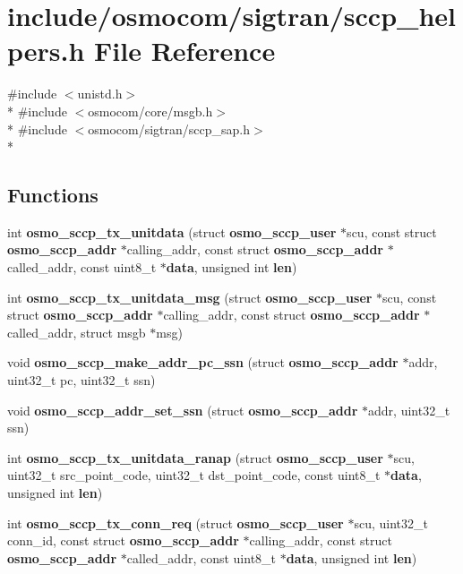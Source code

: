 \section{include/osmocom/sigtran/sccp\+\_\+helpers.h File Reference}
\label{sccp__helpers_8h}
{\ttfamily \#include $<$unistd.\+h$>$}\\*
{\ttfamily \#include $<$osmocom/core/msgb.\+h$>$}\\*
{\ttfamily \#include $<$osmocom/sigtran/sccp\+\_\+sap.\+h$>$}\\*
\subsection*{Functions}
\begin{DoxyCompactItemize}
\item 
int {\bf osmo\+\_\+sccp\+\_\+tx\+\_\+unitdata} (struct {\bf osmo\+\_\+sccp\+\_\+user} $\ast$scu, const struct {\bf osmo\+\_\+sccp\+\_\+addr} $\ast$calling\+\_\+addr, const struct {\bf osmo\+\_\+sccp\+\_\+addr} $\ast$called\+\_\+addr, const uint8\+\_\+t $\ast${\bf data}, unsigned int {\bf len})
\item 
int {\bf osmo\+\_\+sccp\+\_\+tx\+\_\+unitdata\+\_\+msg} (struct {\bf osmo\+\_\+sccp\+\_\+user} $\ast$scu, const struct {\bf osmo\+\_\+sccp\+\_\+addr} $\ast$calling\+\_\+addr, const struct {\bf osmo\+\_\+sccp\+\_\+addr} $\ast$called\+\_\+addr, struct msgb $\ast$msg)
\item 
void {\bf osmo\+\_\+sccp\+\_\+make\+\_\+addr\+\_\+pc\+\_\+ssn} (struct {\bf osmo\+\_\+sccp\+\_\+addr} $\ast$addr, uint32\+\_\+t pc, uint32\+\_\+t ssn)
\item 
void {\bf osmo\+\_\+sccp\+\_\+addr\+\_\+set\+\_\+ssn} (struct {\bf osmo\+\_\+sccp\+\_\+addr} $\ast$addr, uint32\+\_\+t ssn)
\item 
int {\bf osmo\+\_\+sccp\+\_\+tx\+\_\+unitdata\+\_\+ranap} (struct {\bf osmo\+\_\+sccp\+\_\+user} $\ast$scu, uint32\+\_\+t src\+\_\+point\+\_\+code, uint32\+\_\+t dst\+\_\+point\+\_\+code, const uint8\+\_\+t $\ast${\bf data}, unsigned int {\bf len})
\item 
int {\bf osmo\+\_\+sccp\+\_\+tx\+\_\+conn\+\_\+req} (struct {\bf osmo\+\_\+sccp\+\_\+user} $\ast$scu, uint32\+\_\+t conn\+\_\+id, const struct {\bf osmo\+\_\+sccp\+\_\+addr} $\ast$calling\+\_\+addr, const struct {\bf osmo\+\_\+sccp\+\_\+addr} $\ast$called\+\_\+addr, const uint8\+\_\+t $\ast${\bf data}, unsigned int {\bf len})
\item 

\end{DoxyCompactItemize}
